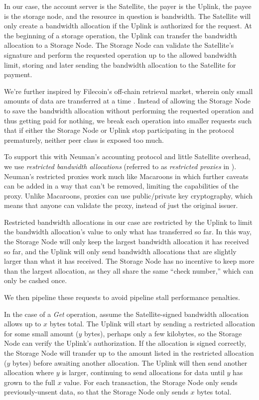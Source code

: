\documentclass[8pt,fleqn,openany]{book}
\begin{document}
In our case, the account server is the
Satellite, the payer is the Uplink, the payee is the storage node, and the
resource in question is bandwidth. The Satellite will only create a bandwidth
allocation if the Uplink is authorized for the request.
At the beginning of a storage operation, the Uplink can transfer the bandwidth
allocation to a Storage Node. The Storage Node can validate the Satellite's
signature and perform the requested operation up to the allowed bandwidth
limit, storing and later sending the bandwidth allocation to the Satellite for
payment.

We're further inspired by Filecoin's off-chain retrieval market,
wherein only small amounts of data are transferred at a time \cite{filecoin}.
Instead of allowing the Storage Node to save the bandwidth allocation
without performing the requested operation and thus getting paid for nothing,
we break each operation into smaller requests such that if either the Storage
Node or Uplink stop participating in the protocol prematurely, neither peer
class is exposed too much.

To support this with Neuman's accounting protocol and little Satellite overhead,
we use {\em restricted bandwidth allocations}
(referred to as {\em restricted proxies} in \cite{proxy-accounting}).
Neuman's restricted proxies work much like Macaroons
\cite{macaroons} in which further caveats can be added in a way that can't be
removed, limiting the capabilities of the proxy. Unlike Macaroons, proxies
can use public/private key cryptography, which means that anyone can validate
the proxy, instead of just the original issuer.

Restricted bandwidth allocations in our case are restricted by the Uplink to
limit the bandwidth allocation's value to only what has transferred so far.
In this way, the Storage Node will only keep the largest bandwidth allocation
it has received so far, and the Uplink will only send bandwidth allocations
that are slightly larger than what it has received.
The Storage Node has no incentive to keep more than the largest allocation, as
they all share the same ``check number,'' which can only be cashed once.

We then pipeline these requests to avoid pipeline stall performance penalties.

In the case of a {\em Get} operation, assume the Satellite-signed bandwidth
allocation allows up to $x$ bytes total. The Uplink
will start by sending a restricted allocation for some small amount ($y$ bytes),
perhaps only a few kilobytes,
so the Storage Node can verify the Uplink's authorization.
If the allocation is signed correctly, the Storage Node will
transfer up to the amount listed in the restricted allocation ($y$ bytes) before
awaiting another allocation. The Uplink will then send another allocation where
$y$ is larger, continuing to send allocations for data until $y$ has grown to
the full $x$ value.
For each transaction, the Storage Node only sends previously-unsent data,
so that the Storage Node only sends $x$ bytes total.
\end{document}
